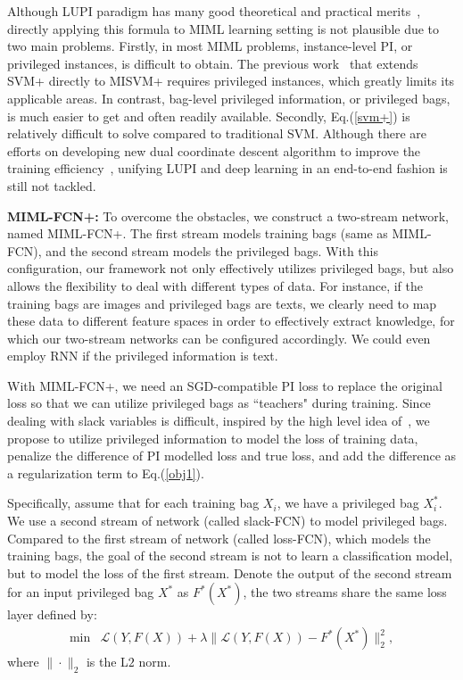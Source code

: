 \documentclass[10pt,twocolumn,letterpaper]{article}
\begin{document}
Although LUPI paradigm has many good theoretical and practical
merits~\cite{Vapnik2009, Vapnik2015a, Vapnik2015b}, directly
applying this formula to MIML learning setting is not plausible
due to two main problems. Firstly, in most MIML problems,
instance-level PI, or privileged instances, is difficult to
obtain. The previous work~\cite{Li2014} that extends SVM+ directly
to MISVM+ requires privileged instances, which greatly limits its
applicable areas. In contrast, bag-level privileged information,
or privileged bags, is much easier to get and often readily
available. Secondly, Eq.(\ref{svm+}) is relatively difficult to
solve compared to traditional SVM. Although there are efforts on
developing new dual coordinate descent algorithm to improve the
training efficiency~\cite{Li2016c}, unifying LUPI and deep
learning in an end-to-end fashion is still not tackled.

\textbf{MIML-FCN+:} To overcome the obstacles, we construct a
two-stream network, named \textsc{MIML-FCN+}. The first stream
models training bags (same as MIML-FCN), and the second stream
models the privileged bags. With this configuration, our framework
not only effectively utilizes privileged bags, but also allows the
flexibility to deal with different types of data. For instance, if
the training bags are images and privileged bags are texts, we
clearly need to map these data to different feature spaces in
order to effectively extract knowledge, for which our two-stream
networks can be configured accordingly. We could even employ RNN
if the privileged information is text.

With \textsc{MIML-FCN+}, we need an SGD-compatible PI loss to
replace the original loss so that we can utilize privileged bags
as ``teachers" during training. Since dealing with slack variables
is difficult, inspired by the high level idea
of~\cite{Vapnik2009}, we propose to utilize privileged information
to model the loss of training data, penalize the difference of PI
modelled loss and true loss, and add the difference as a
regularization term to Eq.(\ref{obj1}).

Specifically, assume that for each training bag $X_i$, we have a
privileged bag $X_i^*$. We use a second stream of network (called
slack-FCN) to model privileged bags. Compared to the first stream
of network (called loss-FCN), which models the training bags, the
goal of the second stream is not to learn a classification model,
but to model the loss of the first stream. Denote the output of
the second stream for an input privileged bag $X^*$ as $F^*(X^*)$,
the two streams share the same loss layer defined by:
\begin{equation}
\label{2fcn-obj}
\begin{matrix}
\min & \mathcal{L}(Y, F(X)) + \lambda\|\mathcal{L}(Y, F(X)) -
F^*(X^*)\|_2^2,
\end{matrix}
\end{equation}
where $\|\cdot\|_2$ is the L$2$ norm.
\end{document}
